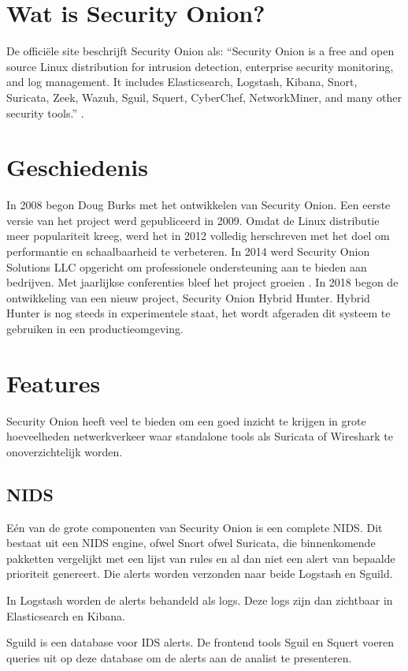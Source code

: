 \documentclass[a4paper, 12pt]{report}
\begin{document}
\section{Wat is Security Onion?}
De officiële site beschrijft Security Onion als:
``Security Onion is a free and open source Linux distribution for intrusion detection, enterprise security monitoring, and log management.
It includes Elasticsearch, Logstash, Kibana, Snort, Suricata, Zeek, Wazuh, Sguil, Squert, CyberChef, NetworkMiner, and many other security tools.'' \autocite{so:docs}.

\section{Geschiedenis}
In 2008 begon Doug Burks met het ontwikkelen van Security Onion.
Een eerste versie van het project werd gepubliceerd in 2009.
Omdat de Linux distributie meer populariteit kreeg, werd het in 2012 volledig herschreven met het doel om performantie en schaalbaarheid te verbeteren.
In 2014 werd Security Onion Solutions LLC opgericht om professionele ondersteuning aan te bieden aan bedrijven.
Met jaarlijkse conferenties bleef het project groeien \autocite{so:sos}.
In 2018 begon de ontwikkeling van een nieuw project, Security Onion Hybrid Hunter.
Hybrid Hunter is nog steeds in experimentele staat, het wordt afgeraden dit systeem te gebruiken in een productieomgeving.

\section{Features}
Security Onion heeft veel te bieden om een goed inzicht te krijgen in grote hoeveelheden netwerkverkeer waar standalone tools als Suricata of Wireshark te onoverzichtelijk worden.

\subsection{NIDS}
Eén van de grote componenten van Security Onion is een complete NIDS.
Dit bestaat uit een NIDS engine, ofwel Snort ofwel Suricata, die binnenkomende pakketten vergelijkt met een lijst van rules en al dan niet een alert van bepaalde prioriteit genereert.
Die alerts worden verzonden naar beide Logstash en Sguild.

In Logstash worden de alerts behandeld als logs.
Deze logs zijn dan zichtbaar in Elasticsearch en Kibana.

Sguild is een database voor IDS alerts.
De frontend tools Sguil en Squert voeren queries uit op deze database om de alerts aan de analist te presenteren.
\end{document}
